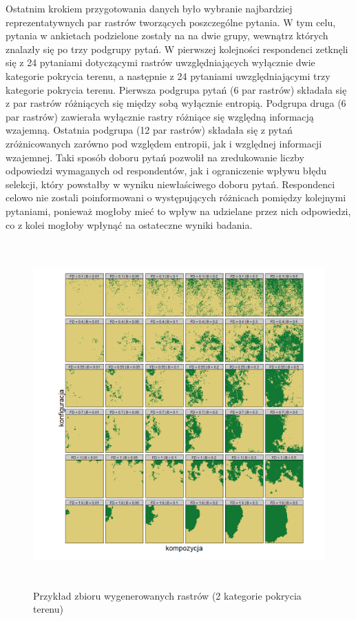 \documentclass{amuthesis}
\begin{document}
Ostatnim krokiem przygotowania danych było wybranie najbardziej
reprezentatywnych par rastrów tworzących poszczególne pytania. W tym
celu, pytania w ankietach podzielone zostały na na dwie grupy, wewnątrz
których znalazły się po trzy podgrupy pytań. W pierwszej kolejności
respondenci zetknęli się z 24 pytaniami dotyczącymi rastrów
uwzględniających wyłącznie dwie kategorie pokrycia terenu, a następnie z
24 pytaniami uwzględniającymi trzy kategorie pokrycia terenu. Pierwsza
podgrupa pytań (6 par rastrów) składała się z par rastrów różniących się
między sobą wyłącznie entropią. Podgrupa druga (6 par rastrów) zawierała
wyłącznie rastry różniące się względną informacją wzajemną. Ostatnia
podgrupa (12 par rastrów) składała się z pytań zróżnicowanych zarówno
pod względem entropii, jak i względnej informacji wzajemnej. Taki sposób
doboru pytań pozwolił na zredukowanie liczby odpowiedzi wymaganych od
respondentów, jak i ograniczenie wpływu błędu selekcji, który powstałby
w wyniku niewłaściwego doboru pytań. Respondenci celowo nie zostali
poinformowani o występujących różnicach pomiędzy kolejnymi pytaniami,
ponieważ mogłoby mieć to wpływ na udzielane przez nich odpowiedzi, co z
kolei mogłoby wpłynąć na ostateczne wyniki badania.

\begin{figure}[t]

{\centering \includegraphics[width=1\textwidth,height=5.20833in]{figures/wykres1_2classes.png}

}

\caption{\label{fig-wykres1_2classes}Przykład zbioru wygenerowanych
rastrów (2 kategorie pokrycia terenu)}

\end{figure}
\end{document}
